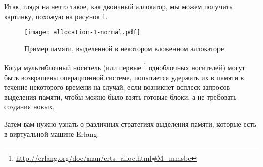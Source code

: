 \documentclass[11pt, oneside]{book}   	%
\newcommand\NamedRef[1]{\ref{#1} <<\nameref{#1}>>}
\begin{document}
Итак, глядя на нечто такое, как двоичный аллокатор, мы можем получить картинку, похожую на рисунок \ref{fig:allocation-1-normal}.

\begin{figure}
  \texttt{[image: allocation-1-normal.pdf]}%
	\caption{Пример памяти, выделенной в некотором вложенном аллокаторе}
   \label{fig:allocation-1-normal}
\end{figure}
\FloatBarrier

Когда мультиблочный носитель (или первые \footnote{\href{http://erlang.org/doc/man/erts\_alloc.html\#M\_mmsbc}{http://erlang.org/doc/man/erts\_alloc.html\#M\_mmsbc}} одноблочных носителей) могут быть возвращены операционной системе,  попытается удержать их в памяти в течение некоторого времени на случай, если возникнет всплеск запросов выделения памяти, чтобы можно было взять готовые блоки, а не требовать создания новых.

Затем вам нужно узнать о различных стратегиях выделения памяти, которые есть в виртуальной машине Erlang:
\end{document}
